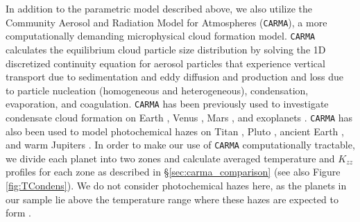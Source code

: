 \documentclass[twocolumn]{aastex63}
\begin{document}
In addition to the parametric model described above, we also utilize the Community Aerosol and Radiation Model for Atmospheres (\texttt{CARMA}), a more computationally demanding microphysical cloud formation model.  \texttt{CARMA} calculates the equilibrium cloud particle size distribution by solving the 1D discretized continuity equation for aerosol particles that experience vertical transport due to sedimentation and eddy diffusion and production and loss due to particle nucleation (homogeneous and heterogeneous), condensation, evaporation, and coagulation. \texttt{CARMA} has been previously used to investigate condensate cloud formation on Earth \citep[e.g.,][]{ackerman1993,ackerman1995,jensen1994}, Venus \citep[e.g.][]{james1997,mcgouldrick2007,GAO201483}, Mars \citep[e.g.][]{colaprete1999}, and exoplanets \citep[e.g.,][]{gao2018,gao2020,Powell_2019}.  \texttt{CARMA} has also been used to model photochemical hazes on Titan \citep{toon1992}, Pluto \citep{gao2017pluto}, ancient Earth \citep{wolf2010}, and warm Jupiters \citep{adams2019}. In order to make our use of \texttt{CARMA} computationally tractable, we divide each planet into two zones and calculate averaged temperature and $K_{zz}$ profiles for each zone as described in \S\ref{sec:carma_comparison} (see also Figure \ref{fig:TCondens}).  We do not consider photochemical hazes here, as the planets in our sample lie above the temperature range where these hazes are expected to form \citep{lodders2002,kawashima2019,gao2020}.

\end{document}

